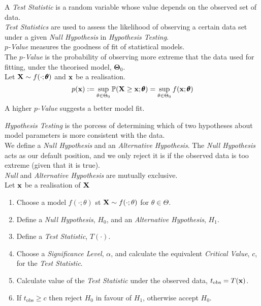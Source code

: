 \documentclass[11pt,a4paper]{article}
\begin{document}
A \textit{Test Statistic} is a random variable whose value depends on the observed set of data.\\
\textit{Test Statistics} are used to assess the likelihood of observing a certain data set under a given \textit{Null Hypothesis} in \textit{Hypothesis Testing}.\\

\textit{$p$-Value} measures the goodness of fit of statistical models.\\
The \textit{$p$-Value} is the probability of observing more extreme that the data used for fitting, under the theorised model, $\pmb\Theta_0$.\\
Let $\textbf{X}\sim f(\cdot;\pmb\theta)$ and $\textbf{x}$ be a realisation.
$$p(\textbf{x}):=\sup_{\theta\in\Theta_0}\mathbb{P}(\textbf{X}\geq \textbf{x};\pmb\theta)=\sup_{\theta\in\Theta_0}f(\textbf{x};\pmb\theta)$$
A higher \textit{$p$-Value} suggests a better model fit.\\



\textit{Hypothesis Testing} is the porcess of determining which of two hypotheses about model parameters is more consistent with the data.\\
We define a \textit{Null Hypothesis} and an \textit{Alternative Hypothesis}. The \textit{Null Hypothesis} acts as our default position, and we only reject it is if the observed data is too extreme (given that it is true).\\
\nb \textit{Null} and \textit{Alternative Hypothesis} are mutually exclusive.\\

Let $\textbf{x}$ be a realisation of $\textbf{X}$
\begin{enumerate}
	\item Choose a model $f(\cdot;\theta)$ st $\textbf{X}\sim f(\cdot;\theta)$ for $\theta\in\Theta$.
	\item Define a \textit{Null Hypothesis}, $H_0$, and an \textit{Alternative Hypothesis}, $H_1$.
	\item Define a \textit{Test Statistic}, $T(\cdot)$.
	\item Choose a \textit{Significance Level}, $\alpha$, and calculate the equivalent \textit{Critical Value}, $c$, for the \textit{Test Statistic}.
	\item Calculate value of the \textit{Test Statistic} under the observed data, $t_\text{obs}=T(\textbf{x})$.
	\item If $t_\text{obs}\geq c$ then reject $H_0$ in favour of $H_1$, otherwise accept $H_0$.
\end{enumerate}
\end{document}
